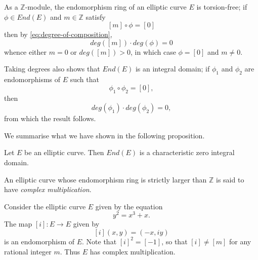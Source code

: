 As a $\mathbb{Z}$-module, the endomorphism ring of an elliptic curve $E$ is
torsion-free; if $\phi \in End(E)$ and $m \in \mathbb{Z}$ satisfy
\begin{equation*}
  \left[m\right] \circ \phi = \left[ 0 \right]
\end{equation*}
then by \eqref{eq:degree-of-composition},
\begin{equation*}
  deg \left(\left[m\right]\right) \cdot deg \left( \phi \right) = 0
\end{equation*}
whence either $m = 0$ or $deg\left(\left[m\right]\right) > 0$, in which case $\phi =
\left[0\right]$ and $m \neq 0$.

Taking degrees also shows that $End(E)$ is an integral domain; if $\phi_{1}$ and
$\phi_{2}$ are endomorphisms of $E$ such that
\begin{equation*}
  \phi_{1} \circ \phi_{2} = \left[0\right],
\end{equation*}
then
\begin{equation*}
  deg \left( \phi_{1} \right) \cdot deg \left( \phi_{2} \right) = 0,
\end{equation*}
from which the result follows.

We summarise what we have shown in the following proposition.

\begin{prop}
  \label{prop:End(E)-is-char-zero-id}
  Let $E$ be an elliptic curve.  Then $End(E)$ is a characteristic zero integral
  domain.
\end{prop}

An elliptic curve whose endomorphism ring is strictly larger than $\mathbb{Z}$ is
said to have \emph{complex multiplication}.

\begin{example}
  \label{ex:cm-example}
  Consider the elliptic curve $E$ given by the equation
  \begin{equation*}
    y^{2} = x^{3} + x.
  \end{equation*}
  The map $\left[ i \right] \colon E \rightarrow E$ given by
  \begin{equation*}
    \left[ i \right](x,y) = (-x,iy)
  \end{equation*}
  is an endomorphism of $E$.  Note that $\left[ i \right]^{2} = \left[ -1 \right]$,
  so that $\left[ i \right] \neq \left[ m \right]$ for any rational integer $m$.
  Thus $E$ has complex multiplication.
\end{example}

